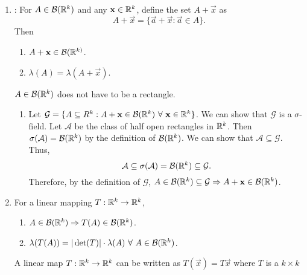 \documentclass[class=article,crop=false]{standalone}
\begin{document}
\begin{property}[]
~\begin{enumerate}[label=\arabic*)]
	\item {}: For $ A \in \mathcal{B}( \mathbb{R}^{k} )$ and any $ {\mathbf{ x}} \in \mathbb{R}^{k} $, define the set $ A + \vec{ x} $ as 
		\[
		A + \vec{ x} = \{ \vec{ a}+ \vec{ x}: \vec{ a} \in A   \}  
		.\] 
		Then
		\begin{enumerate}[label=(\roman*)]
			\item $ A+ {\mathbf{ x}} \in \mathcal{B}( \mathbb{R}^{k)} $.
			\item $ \lambda (A) = \lambda (A + \vec{ x} )$.
		\end{enumerate}
		\begin{note}[]
			$ A \in \mathcal{B}( \mathbb{R}^{k})$ does not have to be a rectangle.
		\end{note}
		\begin{prf}
		\begin{enumerate}[label=(\roman*)]
			\item Let $ \mathcal{G}=\{A \subseteq R^{k}: A + {\mathbf{ x}} \in \mathcal{B}(\mathbb{R}^{k}) \ \forall \ {\mathbf{ x}} \in \mathbb{R}^{k} \} $. We can show that $ \mathcal{G}$ is a $\sigma$-field. Let $ \mathcal{A}$ be the class of half open rectangles in $ \mathbb{R}^{k}$. Then $ \sigma(\mathcal{A}) = \mathcal{B}(\mathbb{R}^{k})$ by the definition of $ \mathcal{B}(\mathbb{R}^{k})$. We can show that $ \mathcal{A} \subseteq \mathcal{G}$. Thus, \[\mathcal{A} \subseteq \sigma(\mathcal{A}) = \mathcal{B}(\mathbb{R}^{k}) \subseteq \mathcal{G}.\] Therefore, by the definition of $ \mathcal{G}$, $ A \in \mathcal{B}(\mathbb{R}^{k}) \subseteq \mathcal{G} \Rightarrow A + {\mathbf{ x}} \in \mathcal{B}(\mathbb{R}^{k}) $.
		\end{enumerate}
		\end{prf}
\item For a linear mapping $ T: \mathbb{R}^{k} \to \mathbb{R}^{k}$, 
	\begin{enumerate}[label=(\roman*)]
		\item $ A \in \mathcal{B}( \mathbb{R}^{k}) \Rightarrow T(A) \in \mathcal{B}( \mathbb{R}^{k})$.
		\item $ \lambda(T(A)) = | \det(T)| \cdot \lambda(A) \ \forall \ A \in \mathcal{B}( \mathbb{R}^{k})$. 
	\end{enumerate}
	\begin{note}[]
		A linear map $ T: \mathbb{R}^{k} \to \mathbb{R}^{k}$ can be written as $ T( \vec{ x}) = T \vec{ x}  $ where $ T$ is a  $ k\times k$
	\end{note}
\end{enumerate}
\end{property}
\end{document}
